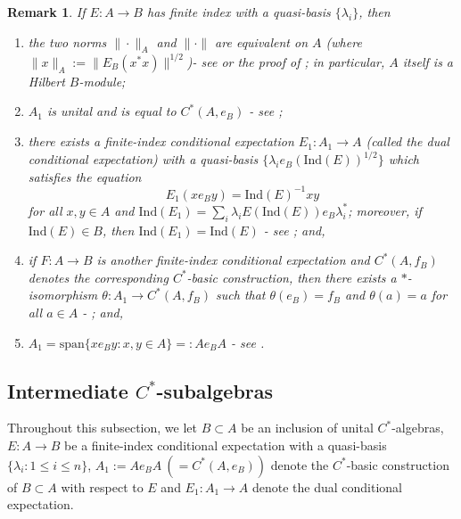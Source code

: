 \documentclass[a4]{amsart}
\newtheorem{remark}[theorem]{\bf Remark}
\numberwithin{equation}{section}
\begin{document}
\begin{remark}\label{useful-obsns}
  If $E:A \to B$ has finite index with a quasi-basis $\{\lambda_i\}$, then
  \begin{enumerate}
  \item the two norms $\|\cdot\|_A$ and $\|\cdot\|$ are equivalent on $A$ (where
  $\|x\|_A:= \|E_B(x^*x)\|^{1/2}$)- see \cite{Wat} or the proof of \cite[Lemma
  2.11]{BG2}; in particular, $A$ itself is a Hilbert $B$-module;
\item $A_1$ is unital and is equal to $C^*(A, e_B)$ - see \cite[Proposition .1.5]{Wat};
  \item there exists a finite-index conditional expectation $E_1: A_1
  \to A$ (called the dual conditional expectation) with a quasi-basis
  $\{\lambda_i e_B (\mathrm{Ind}(E))^{1/2}\}$ which satisfies the
  equation
  \begin{equation}\label{dual-ce}
E_1(xe_By) =\mathrm{Ind}(E)^{-1}xy
  \end{equation}
  for all $x, y \in A$ and $\mathrm{Ind}(E_1) = \sum_i \lambda_i
  E(\mathrm{Ind}(E))e_B \lambda_i^*$; moreover,
     if $\mathrm{Ind}(E)\in B$, then $\mathrm{Ind}(E_1) =
      \mathrm{Ind}(E)$ -  see \cite[Propositions
    2.3.2 $\&$ 2.3.4]{Wat}; and,
\item if $F: A \to B$ is another finite-index conditional expectation
  and $C^*(A, f_B)$ denotes the corresponding $C^*$-basic
  construction, then there exists a $*$-isomorphism $\theta: A_1 \to
  C^*(A, f_B)$ such that $\theta(e_B) = f_B$ and $\theta(a)=a$ for all $a
  \in A$ - \cite[Proposition 2.10.11]{Wat}; and,
      \item $A_1 = \mathrm{span}\{xe_By : x, y \in A\}=:Ae_BA$ - see
 \cite[Lemma 2.2.2]{Wat}.
      \end{enumerate}
\end{remark}

\subsection{Intermediate $C^*$-subalgebras}

Throughout this subsection, we let $B \subset A$ be an inclusion of
unital $C^*$-algebras, $E: A \to B$ be a finite-index conditional
expectation with a quasi-basis $\{\lambda_i: 1 \leq i \leq n\}$,
$A_1:=Ae_BA\ (=C^*(A, e_B))$ denote the $C^*$-basic construction of $B
\subset A$ with respect to $E$ and $E_1: A_1 \to A$ denote the dual
conditional expectation.
\end{document}
